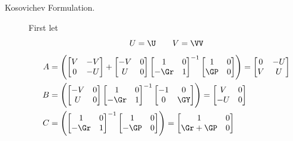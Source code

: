\begin{description}
\item[Kosovichev Formulation.]
First let \citep[][his Equations~40; 43-45; 48]{Kosovichev1999}
\begin{equation}
    U = \U \qquad V = \VV
\end{equation}
\begin{align}
A &= \left(
  \begin{bmatrix} 
    V & -V \\
    0 & -U
  \end{bmatrix} 
  +
  \begin{bmatrix} 
    -V & 0 \\
    U & 0
  \end{bmatrix} 
  \begin{bmatrix} 
    1 & 0 \\
    -\Gr & 1
  \end{bmatrix}^{-1}
  \begin{bmatrix} 
    1 & 0 \\
    \GP & 0
  \end{bmatrix} \right)
= \begin{bmatrix}
    0 & -U \\
    V & U
  \end{bmatrix} \\
B &= \left(
  \begin{bmatrix}
    -V & 0 \\
    U & 0
  \end{bmatrix}
  \begin{bmatrix}
    1 & 0 \\
    -\Gr & 1
  \end{bmatrix}^{-1}
  \begin{bmatrix}
    -1 & 0 \\
    0 & \GY
  \end{bmatrix} \right)
= \begin{bmatrix}
    V & 0 \\
    -U & 0
  \end{bmatrix} \\
C &= \left(
  \begin{bmatrix} 
    1 & 0 \\
    -\Gr & 1
  \end{bmatrix}^{-1}
  \begin{bmatrix} 
    1 & 0 \\
    -\GP & 0
  \end{bmatrix} \right) 
= \begin{bmatrix}
    1 & 0 \\
    \Gr + \GP & 0

\end{bmatrix}
\end{align}
\end{description}
